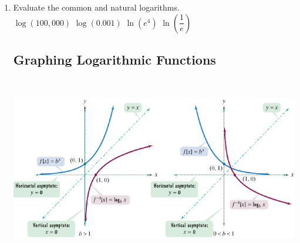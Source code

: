 \begin{enumerate}
\item Evaluate the common and natural logarithms.\\
$\log (100,000)$  \hspace{1in} $\log (0.001)$  \hspace{1in} $\ln (e^4)$   \hspace{1in} $\ln \left(\dfrac{1}{e}\right)$ \\

\subsection{Graphing Logarithmic Functions} ~

\includegraphics{loggraph}


\end{enumerate}
